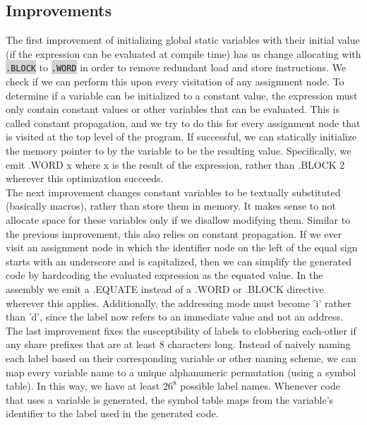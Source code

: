 \documentclass[12pt]{article}
\newcommand{\code}[1]{\colorbox{LightGray}{\texttt{#1}}}
\begin{document}
\subsection*{Improvements}
The first improvement of initializing global static variables with their initial value (if the expression can be evaluated at compile time) has us change allocating with \code{.BLOCK} to \code{.WORD} in order to remove redundant load and store instructions. We check if we can perform this upon every visitation of any assignment node. To determine if a variable can be initialized to a constant value, the expression must only contain constant values or other variables that can be evaluated. This is called constant propagation, and we try to do this for every assignment node that is visited at the top level of the program. If successful, we can statically initialize the memory pointer to by the variable to be the resulting value. Specifically, we emit .WORD x where x is the result of the expression, rather than .BLOCK 2 wherever this optimization succeeds.\\

The next improvement changes constant variables to be textually substituted (basically macros), rather than store them in memory. It makes sense to not allocate space for these variables only if we disallow modifying them. Similar to the previous improvement, this also relies on constant propagation. If we ever visit an assignment node in which the identifier node on the left of the equal sign starts with an underscore and is capitalized, then we can simplify the generated code by hardcoding the evaluated expression as the equated value. In the assembly we emit a .EQUATE instead of a .WORD or .BLOCK directive wherever this applies. Additionally, the addressing mode must become 'i' rather than 'd', since the label now refers to an immediate value and not an address.\\

The last improvement fixes the susceptibility of labels to clobbering each-other if any share prefixes that are at least 8 characters long. Instead of naively naming each label based on their corresponding variable or other naming scheme, we can map every variable name to a unique alphanumeric permutation (using a symbol table). In this way, we have at least $26^{8}$ possible label names. Whenever code that uses a variable is generated, the symbol table maps from the variable's identifier to the label used in the generated code.
\end{document}
